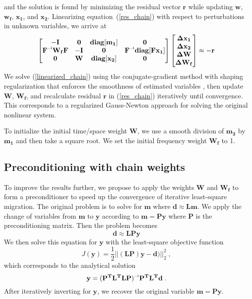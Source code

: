 and the solution is found by minimizing the residual vector $\mathbf{r}$ while updating $\mathbf{w}$, $\mathbf{w_f}$, $\mathbf{x_1}$, and $\mathbf{x_2}$. Linearizing equation~(\ref{res_chain}) with respect to perturbations in unknown variables, we arrive at
\begin{equation}
\begin{bmatrix}
\mathbf{-I} & \mathbf{0} & \mathbf{diag[m_1]} & \mathbf{0}\\
\mathbf{\inv{F}W_{f}F} & \mathbf{-I} & \mathbf{0} & \mathbf{\inv{F}diag[Fx_1]}\\
\mathbf{0} & \mathbf{W} & \mathbf{diag[x_2]}  & \mathbf{0}
\end{bmatrix}
\begin{bmatrix}
\mathbf{\Delta x_1} \\
\mathbf{\Delta x_2} \\
\mathbf{\Delta W} \\
\mathbf{\Delta W_f}
\end{bmatrix}
\approx \mathbf{-r} 
\label{linearized_chain}
\end{equation}
We solve (\ref{linearized_chain}) using the conjugate-gradient method with shaping regularization that enforces the smoothness of estimated variables \cite[]{shaping}, then update $\mathbf{W}$, $\mathbf{W_f}$, and recalculate residual $\mathbf{r}$ in (\ref{res_chain}) iteratively until  convergence. This corresponds to a regularized Gauss-Newton approach for solving the original nonlinear system.

To initialize the initial time/space weight $\mathbf{W}$, we use a smooth division of $\mathbf{m_2}$ by $\mathbf{m_1}$ \cite[]{local} and then take a square root. We set the initial frequency weight $\mathbf{W_f}$ to 1.


\subsection*{Preconditioning with chain weights}

To improve the results further, we propose to apply the weights $\mathbf{W}$ and $\mathbf{W_{f}}$ to form a preconditioner to speed up the convergence of iterative least-square migration. The original problem is to solve for $\mathbf{m}$ where $\mathbf{d \approx Lm}$. We apply the change of variables from $\mathbf{m}$ to $\mathbf{y}$ according to $\mathbf{m} = \mathbf{Py}$ where $\mathbf{P}$ is the preconditioning matrix. Then the problem becomes
\begin{equation}
    \mathbf{d} \approx \mathbf{LPy}
\end{equation}
We then solve this equation for $\mathbf{y}$ with the least-square objective function 
\begin{equation}
     J(\mathbf{y}) = \frac{1}{2} || \mathbf{(LP)y - d) }||_2 ^2\;,
\end{equation}
which corresponds to the analytical solution
\begin{equation}
    \mathbf{y = \inv{(P^{T}L^{T}LP)}P^{T}L^{T}d}\;.
\label{sol_y}
\end{equation}
After iteratively inverting for $\mathbf{y}$, we recover the original variable $\mathbf{m = Py}$.

